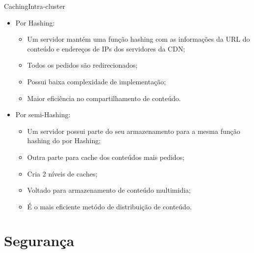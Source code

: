 \documentclass{beamer}
\begin{document}
\begin{frame}{Caching}{Intra-cluster}
\begin{itemize}
\item Por Hashing:
\begin{itemize}
\item Um servidor mant\'em uma fun\c{c}\~ao hashing com as informa\c{c}\~oes da URL do conte\'udo e endere\c{c}os de IPs dos servidores da CDN;
\item Todos os pedidos s\~ao redirecionados;
\item Possui baixa complexidade de implementa\c{c}\~ao;
\item Maior efici\^encia no compartilhamento de conte\'udo.
\end{itemize}
\item Por semi-Hashing:
\begin{itemize}
\item Um servidor possui parte do seu armazenamento para a mesma fun\c{c}\~ao hashing do por Hashing;
\item Outra parte para cache dos conte\'udos mais pedidos;
\item Cria 2 n\'iveis de caches;
\item Voltado para armazenamento de conte\'udo multimidia;
\item \'E o mais eficiente met\'odo de distribui\c{c}\~ao de conte\'udo.
\end{itemize}
\end{itemize}
\end{frame}
\section{Seguran\c{c}a}
\end{document}
